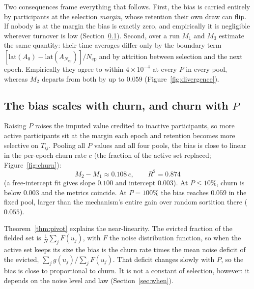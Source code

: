 \documentclass[sigconf,anonymous,review,nonacm]{acmart}
\begin{document}
Two consequences frame everything that follows. First, the bias is carried entirely by
participants at the selection \emph{margin}, whose retention their own draw can flip. If
nobody is at the margin the bias is exactly zero, and empirically it is negligible wherever
turnover is low (Section~\ref{sec:churn}).
Second, over a run $M_1$ and $M_3$ estimate the same quantity: their time averages differ
only by the boundary term $[\mathrm{lat}(A_0)-\mathrm{lat}(A_{N_{\mathrm{ep}}})]/N_{\mathrm{ep}}$
and by attrition between selection and the next epoch. Empirically they agree to within
$4\times10^{-4}$ at every $P$ in every pool, whereas $M_2$ departs from both by up to
$0.059$ (Figure~\ref{fig:divergence}).

\subsection{The bias scales with churn, and churn with $P$}
\label{sec:churn}
Raising $P$ raises the imputed value
credited to inactive participants, so more active participants sit at the margin each
epoch and retention becomes more selective on $T_{ij}$. Pooling all $P$ values and all four
pools, the bias is close to linear in the per-epoch churn rate $c$ (the fraction of the
active set replaced; Figure~\ref{fig:churn}):
\begin{equation}
M_2-M_1\approx 0.108\,c,\qquad R^2=0.874
\end{equation}
(a free-intercept fit gives slope $0.100$ and intercept $0.003$). At $P\le10\%$, churn is
below $0.003$ and the metrics coincide. At $P=100\%$ the bias reaches $0.059$ in the fixed
pool, larger than the mechanism's entire gain over random sortition there ($0.055$).

Theorem~\ref{thm:pivot} explains the near-linearity. The evicted fraction of the fielded
set is $\frac1{N}\sum_j F(u_j)$, with $F$ the noise distribution function, so when the
active set keeps its size the bias is the churn rate times the mean noise deficit of the
evicted, $\sum_j g(u_j)/\sum_j F(u_j)$. That deficit changes slowly with $P$, so the bias
is close to proportional to churn. It is not a constant of selection, however: it depends on
the noise level and law (Section~\ref{sec:when}).
\end{document}

